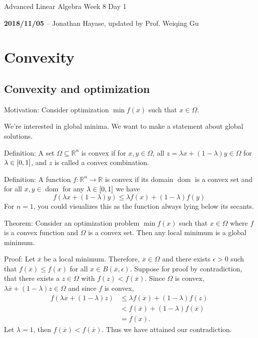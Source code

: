 \documentclass{article}
\newcommand{\RR}{\mathbb{R}}
\begin{document}
\begin{center}
  \Large Advanced Linear Algebra Week 8 Day 1
  \normalsize

  \textbf{2018/11/05} -- Jonathan Hayase, updated by Prof. Weiqing Gu
\end{center}

\section{Convexity}
\subsection{Convexity and optimization}
Motivation: Consider optimization \(\min f(x)\) such that \(x \in \Omega\).

We're interested in global minima.
We want to make a statement about global solutions.

Definition: A set \(\Omega \subseteq \RR^n\) is convex if for \(x, y \in \Omega\), all \(z = \lambda x + (1-\lambda)y \in \Omega\) for \(\lambda \in \intcc{0, 1}\), and \(z\) is called a convex combination.

Definition: A function \(f : \RR^n \to \RR\) is convex if its domain \(\mathop{\mathrm{dom}}\) is a convex set and for all \(x, y \in \mathop{\mathrm{dom}}\) for any \(\lambda \in \intcc{0, 1}\) we have
\[f(\lambda x + (1-\lambda)y) \leq \lambda f(x)  + (1-\lambda)f(y)\]
For \(n = 1\), you could visualizes this as the function always lying below its secants.

Theorem: Consider an optimization problem \(\min f(x)\) such that \(x \in \Omega\) where \(f\) is a convex function and \(\Omega\) is a convex set.
Then any local minimum is a global minimum.

Proof: Let \(\overline x\) be a local minimum.
Therefore, \(\overline x \in \Omega\) and there exists \(\epsilon > 0\) such that \(f(\overline x) \leq f(x)\) for all \(x \in B(\overline x, \epsilon)\).
Suppose for proof by contradiction, that there exists a \(z \in \Omega\) with \(f(z) < f(\overline x)\).
Since \(\Omega\) is convex, \(\lambda \overline x + (1- \lambda)z \in \Omega\) and since \(f\) is convex,
\begin{align*}
  f(\lambda\overline x + (1-\lambda)z) &\leq \lambda f(\overline x) + (1 - \lambda)f(z)\\
                                       &<f(\overline x) + (1-\lambda)f(\overline x)\\
  &= f(x).
\end{align*}
Let \(\lambda = 1\), then \(f(\overline x) < f(\overline x)\).
Thus we have attained our contradiction.
\end{document}
